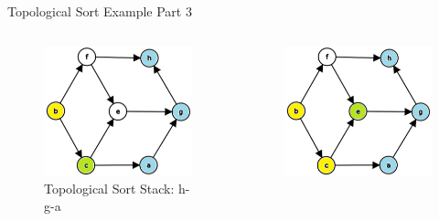 \documentclass[aspectratio=169]{beamer}%
\begin{document}
\begin{frame}{Topological Sort Example Part 3}
    \begin{columns}
        \begin{column}{.32\textwidth}
            \begin{figure}
                \centering
                \includegraphics[width = .9\linewidth]{topsort7.png}
                \caption{Topological Sort Stack: h-g-a}
            \end{figure}
        \end{column}
        \hfill
        \begin{column}{.32\textwidth}
            \begin{figure}
                \centering
                \includegraphics[width = .9\linewidth]{topsort8.png}

\end{figure}
\end{column}
\end{columns}
\end{frame}
\end{document}
